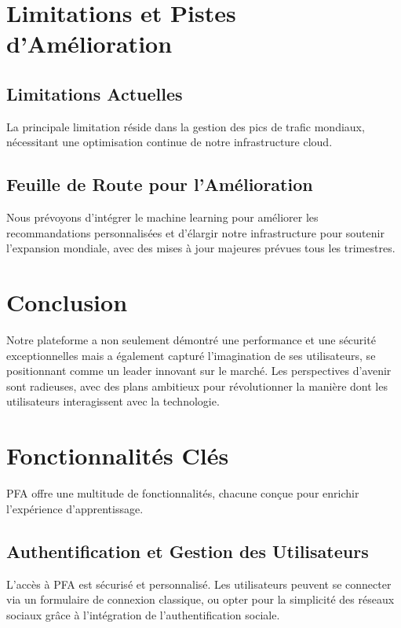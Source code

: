 \section{Limitations et Pistes d'Amélioration}

\subsection{Limitations Actuelles}
La principale limitation réside dans la gestion des pics de trafic mondiaux, nécessitant une optimisation continue de notre infrastructure cloud.

\subsection{Feuille de Route pour l'Amélioration}
Nous prévoyons d'intégrer le machine learning pour améliorer les recommandations personnalisées et d'élargir notre infrastructure pour soutenir l'expansion mondiale, avec des mises à jour majeures prévues tous les trimestres.

\section{Conclusion}

Notre plateforme a non seulement démontré une performance et une sécurité exceptionnelles mais a également capturé l'imagination de ses utilisateurs, se positionnant comme un leader innovant sur le marché. Les perspectives d'avenir sont radieuses, avec des plans ambitieux pour révolutionner la manière dont les utilisateurs interagissent avec la technologie.

\section{Fonctionnalités Clés}

PFA offre une multitude de fonctionnalités, chacune conçue pour enrichir l'expérience d'apprentissage.

\subsection{Authentification et Gestion des Utilisateurs}

L'accès à PFA est sécurisé et personnalisé. Les utilisateurs peuvent se connecter via un formulaire de connexion classique, ou opter pour la simplicité des réseaux sociaux grâce à l'intégration de l'authentification sociale.

